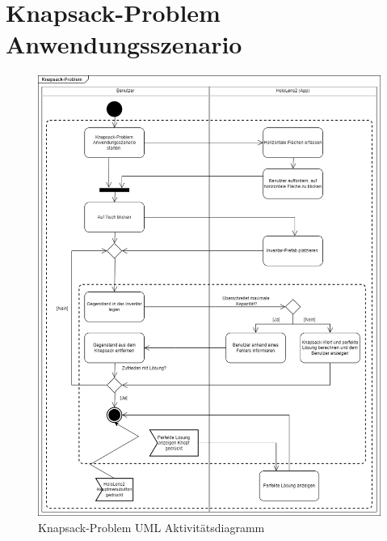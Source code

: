 \section{Knapsack-Problem Anwendungsszenario}
\begin{figure}[htbp]
	\centering
	\includegraphics[width=\textwidth]{images/Knapsack_Ablauf.png}
	\caption{Knapsack-Problem UML Aktivitätsdiagramm}
\end{figure}
\newpage